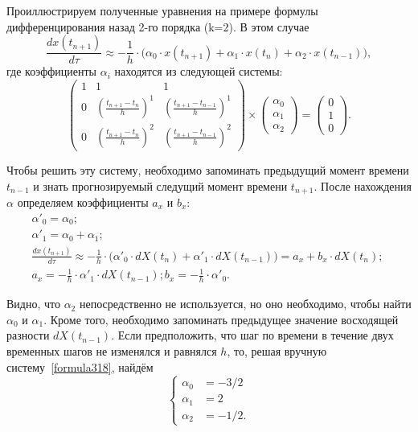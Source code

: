 Проиллюстрируем полученные уравнения на примере формулы дифференцирования назад 2-го порядка (k=2). В этом случае
\begin{equation}
\label{formula317}
\frac{dx(t_{n+1})}{d\tau}\approx -\frac 1 h \cdot \bigg(\alpha_0\cdot x(t_{n+1}) + \alpha_1\cdot x(t_n) + \alpha_2\cdot x(t_{n-1}) \bigg),
\end{equation} 
где коэффициенты $\alpha_i$ находятся из следующей системы:
\begin{equation}
\label{formula318}
\begin{pmatrix}
1 & 1 & 1 \\
0 & \left(\frac{t_{n+1}-t_n}{h} \right)^1 & \left(\frac{t_{n+1}-t_{n-1}}{h} \right)^1 \\
0 & \left(\frac{t_{n+1}-t_n}{h} \right)^2 & \left(\frac{t_{n+1}-t_{n-1}}{h} \right)^2 
\end{pmatrix} \times 
\begin{pmatrix}
\alpha_0 \\
\alpha_1 \\
\alpha_2
\end{pmatrix} =
\begin{pmatrix}
0 \\
1 \\
0
\end{pmatrix}.
\end{equation}

Чтобы решить эту систему, необходимо запоминать предыдущий момент времени $t_{n-1}$ и знать прогнозируемый следущий момент времени $t_{n+1}$. После нахождения $\alpha$ определяем коэффициенты $a_x$ и $b_x$:
\begin{eqnarray}
\label{formula319}
\alpha'_0=\alpha_0; \nonumber ~\\
\alpha'_1=\alpha_0+\alpha_1; \nonumber ~\\
\frac{dx(t_{n+1})}{d\tau}\approx -\frac 1 h \cdot \big(\alpha'_0\cdot dX(t_n) + \alpha'_1\cdot dX(t_{n-1}) \big) = a_x+b_x \cdot dX(t_n); \nonumber ~\\
a_x=-\frac 1 h \cdot \alpha'_1 \cdot dX(t_{n-1}); b_x=-\frac 1 h \cdot \alpha'_0.
\end{eqnarray}

Видно, что $\alpha_2$ непосредственно не используется, но оно необходимо, чтобы найти $\alpha_0$ и $\alpha_1$. Кроме того, необходимо запоминать предыдущее значение восходящей разности $dX(t_{n-1})$. Если предположить, что шаг по времени в течение двух временных шагов не изменялся и равнялся $h$, то, решая вручную систему~\eqref{formula318}, найдём
\begin{equation*}
\left\{
\begin{aligned}
\alpha_0 & = -3/2 \\
\alpha_1 & = 2 \\
\alpha_2 & = -1/2.
\end{aligned}
\right.
\end{equation*}

